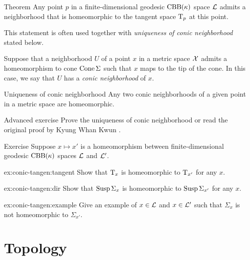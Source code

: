 \begin{thm}{Theorem}\label{thm:spherical-nbhd}
Any point $p$ in a finite-dimensional geodesic $\mathrm{CBB}(\kappa)$ space $\mathcal{L}$
admits a neighborhood that is homeomorphic to the tangent space $\mathrm{T}_p$ at this point.
\end{thm}

This statement is often used together with \emph{uniqueness of conic neighborhood} stated below.

Suppose that a neighborhood $U$ of a point $x$ in a metric space $\mathcal{X}$
admits a homeomorphism to cone $\mathop{\rm Cone}\nolimits\Sigma$ such that $x$ maps to the tip of the cone.
In this case, we say that $U$ has a \emph{conic neighborhood} of $x$.

\begin{thm}{Uniqueness of conic neighborhood}\label{lem:kwun}
Any two conic neighborhoods of a given point in a metric space are homeomorphic.
\end{thm}

\begin{thm}{Advanced exercise}\label{ex:conic}
Prove the uniqueness of conic neighborhood or read the original proof by Kyung Whan Kwun \cite{kwun1964}.
\end{thm}

\begin{thm}{Exercise}\label{ex:conic-tangent}
Suppose $x\mapsto x'$ is a homeomorphism between finite-dimensional geodesic $\mathrm{CBB}(\kappa)$ spaces $\mathcal{L}$ and $\mathcal{L}'$.

\begin{subthm}{ex:conic-tangen:tangent}
Show that $\mathrm{T}_x$ is homeomorphic to $\mathrm{T}_{x'}$ for any $x$.
\end{subthm}

\begin{subthm}{ex:conic-tangen:dir}
Show that $\mathop{\rm Susp}\nolimits\Sigma_x$ is homeomorphic to $\mathop{\rm Susp}\nolimits\Sigma_{x'}$ for any $x$.
\end{subthm}

\begin{subthm}{ex:conic-tangen:example}
Give an example of $x\in\mathcal{L}$ and $x\in\mathcal{L}'$
such that $\Sigma_x$ is not homeomorphic to $\Sigma_{x'}$.
\end{subthm}


\end{thm}



\section{Topology}

